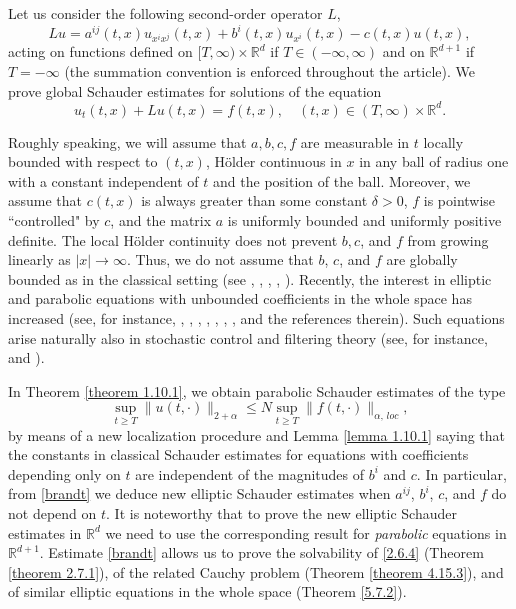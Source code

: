 \documentclass[reqno,12pt]{amsart}
\theoremstyle{definition}
\theoremstyle{remark}
\begin{document}
   Let us consider the following second-order
operator $L$,
\begin{equation}                                    \label{lu}
L u = a^{ij}(t,x)u_{x^{i}x^{j}}(t,x) + b^{i}(t,x) u_{x^i}(t,x)
-c(t,x)u(t,x),
\end{equation}
   acting on functions defined
on  $[T, \infty) \times {\mathbb{R}}^d$ if $T \in (-\infty,  \infty)$ and
   on ${\mathbb{R}}^{d+1}$ if $T=-\infty$
(the summation convention is enforced throughout the article).
   We prove   global Schauder estimates for
solutions of the equation
\begin{equation}
                                                \label{2.6.4}
u_{t}(t,x) + Lu(t,x) = f(t,x),\quad (t,x) \in ( T,   \infty)
\times
   {\mathbb{R}}^{d}.
\end{equation}

Roughly speaking, we will assume that $a,b,c,f$ are measurable in
$t$ locally bounded with respect to $(t,x)$, H\"older continuous
in $x$ in any ball of radius one with a constant independent of
$t$ and the position of the ball.   Moreover,  we assume that
$c(t,x)$ is always greater than some  constant $\delta
 > 0$, $f$ is pointwise ``controlled" by $c$, and the matrix $a$
is uniformly bounded and uniformly positive definite. The local
H\"older continuity does not prevent $b,c$, and $f$ from growing
linearly as $|x|\to\infty$. Thus, we do not assume that  $b$, $c$,
and $f$ are globally bounded as in the classical setting (see
\cite{B}, \cite{Kn}, \cite{LSU}, \cite{L}, \cite{Lo}).
  Recently, the interest in elliptic and
parabolic equations with unbounded coefficients in the whole space
has  increased (see, for instance, \cite{BL}, \cite{Ce},
\cite{DL},  \cite{DG}, \cite{Lu1},
\cite{LV},
 \cite{MPW},  \cite{P}
and the references therein). Such equations arise naturally also
in stochastic control and filtering theory (see, for instance,
\cite{FM} and \cite{S}).  

   In Theorem \ref{theorem 1.10.1},  we
obtain parabolic   Schauder estimates of the type
\begin{equation}
                                                    \label{brandt}
\sup_{t\ge  T} \| u(t,\cdot) \|_{ 2+\alpha}\leq N \sup_{t\ge  T}
\| f(t,\cdot)\|_{\alpha,\, loc},
\end{equation}
by means of a new localization procedure   and Lemma 
\ref{lemma 1.10.1} saying that the constants in
classical Schauder estimates
for equations with coefficients depending only on $t$
are independent of the magnitudes of $b^i$ and $c$. In particular, from
\eqref{brandt} we deduce new elliptic Schauder estimates  when $a^{ij}$,
$b^i$, $c$,
   and $f$ do not
depend on $t$.     It is noteworthy that  to prove
    the new
   elliptic Schauder estimates in ${\mathbb{R}}^d$ we need to
use the corresponding result for {\em parabolic\/} equations
   in ${\mathbb{R}}^{d+1}$.
Estimate \eqref{brandt} allows us to prove the solvability of
\eqref{2.6.4} (Theorem \ref{theorem 2.7.1}), of the
   related  Cauchy problem
(Theorem \ref{theorem 4.15.3}), and of similar elliptic equations
in the whole space (Theorem \ref{5.7.2}).
\end{document}
